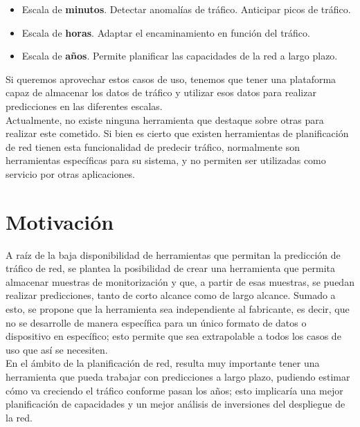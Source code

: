 \documentclass[a4paper, oneside, 12pt]{book}
\begin{document}
	\begin{itemize}
		\item Escala de \textbf{minutos}. Detectar anomalías de tráfico. Anticipar picos de tráfico.
		
		\item Escala de \textbf{horas}. Adaptar el encaminamiento en función del tráfico.
		
		\item Escala de \textbf{años}. Permite planificar las capacidades de la red a largo plazo.
	\end{itemize}
	
	\noindent Si queremos aprovechar estos casos de uso, tenemos que tener una plataforma capaz de almacenar los datos de tráfico y utilizar esos datos para realizar predicciones en las diferentes escalas. \\
	
	\noindent Actualmente, no existe ninguna herramienta que destaque sobre otras para realizar este cometido. Si bien es cierto que existen herramientas de planificación de red tienen esta funcionalidad de predecir tráfico, normalmente son herramientas específicas para su sistema, y no permiten ser utilizadas como servicio por otras aplicaciones.
	
	\section{Motivación}
	
	\noindent A raíz de la baja disponibilidad de herramientas que permitan la predicción de tráfico de red, se plantea la posibilidad de crear una herramienta que permita almacenar muestras de monitorización y que, a partir de esas muestras, se puedan realizar predicciones, tanto de corto alcance como de largo alcance. Sumado a esto, se propone que la herramienta sea independiente al fabricante, es decir, que no se desarrolle de manera específica para un único formato de datos o dispositivo en específico; esto permite que sea extrapolable a todos los casos de uso que así se necesiten. \\
	
	\noindent En el ámbito de la planificación de red, resulta muy importante tener una herramienta que pueda trabajar con predicciones a largo plazo, pudiendo estimar cómo va creciendo el tráfico conforme pasan los años; esto implicaría una mejor planificación de capacidades y un mejor análisis de inversiones del despliegue de la red. \\
	
\end{document}
